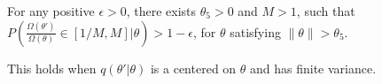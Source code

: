 
\begin{assumption}
For any positive $\epsilon > 0$, there exists $\theta_5 > 0$ and $M > 1$, such that $P(\frac{\Omega(\theta')}{\Omega(\theta)} \in [1/M, M] | \theta) > 1 - \epsilon$, for $\theta$ satisfying $\| \theta \|  > \theta_5$.
  \label{asmp:omega}
\end{assumption}
This holds when $q(\theta'|\theta)$ is a centered on $\theta$ and has 
finite variance.



